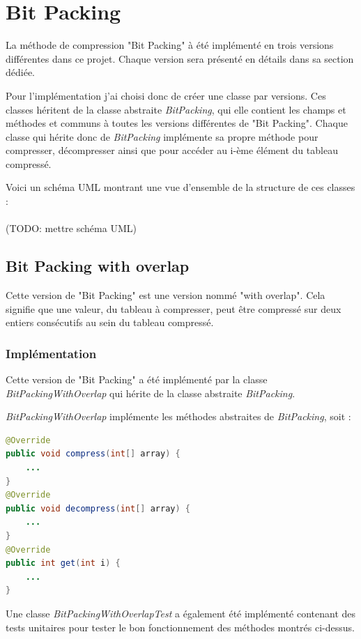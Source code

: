 \documentclass[titlepage]{article}
\begin{document}
\clearpage

\section{Bit Packing}

La méthode de compression "Bit Packing" à été implémenté en trois versions différentes dans ce projet. Chaque version sera présenté en détails dans sa section dédiée.
\par Pour l'implémentation j'ai choisi donc de créer une classe par versions. Ces classes héritent de la classe abstraite \textsl{BitPacking}, qui elle contient les champs et méthodes et communs à toutes les versions différentes de "Bit Packing". Chaque classe qui hérite donc de \textsl{BitPacking} implémente sa propre méthode pour compresser, décompresser ainsi que pour accéder au i-ème élément du tableau compressé.
\par Voici un schéma UML montrant une vue d'ensemble de la structure de ces classes :
\\
\\
(TODO: mettre schéma UML)

\subsection{Bit Packing with overlap}

Cette version de "Bit Packing" est une version nommé "with overlap". Cela signifie que une valeur, du tableau à compresser, peut être compressé sur deux entiers consécutifs au sein du tableau compressé.

\subsubsection{Implémentation}

Cette version de "Bit Packing" a été implémenté par la classe \textsl{BitPackingWithOverlap} qui hérite de la classe abstraite \textsl{BitPacking}.
\par \textsl{BitPackingWithOverlap} implémente les méthodes abstraites de \textsl{BitPacking}, soit :
\begin{lstlisting}[language=Java]
@Override
public void compress(int[] array) {
	...
}
@Override
public void decompress(int[] array) {
	...
}
@Override
public int get(int i) {
	...
}
\end{lstlisting}
\par Une classe \textsl{BitPackingWithOverlapTest} a également été implémenté contenant des tests unitaires pour tester le bon fonctionnement des méthodes montrés ci-dessus.
\end{document}
